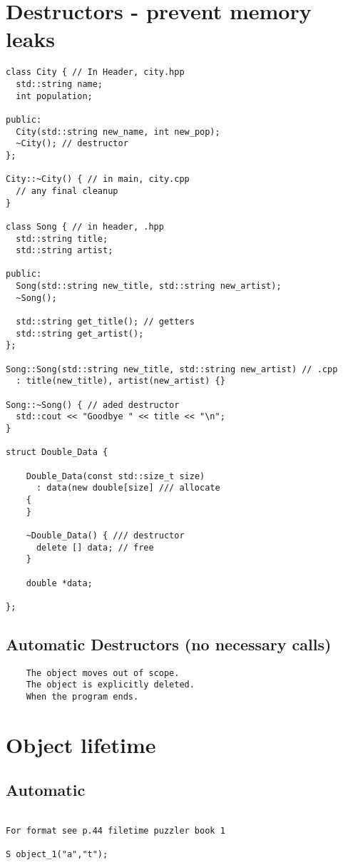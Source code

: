 \documentclass[openany]{report}
\begin{document}
\section{Destructors - prevent memory leaks}

\begin{verbatim}
class City { // In Header, city.hpp
  std::string name;
  int population;
 
public:
  City(std::string new_name, int new_pop);
  ~City(); // destructor
};
 
City::~City() { // in main, city.cpp
  // any final cleanup
}

class Song { // in header, .hpp
  std::string title;
  std::string artist;

public:
  Song(std::string new_title, std::string new_artist);
  ~Song();
  
  std::string get_title(); // getters
  std::string get_artist();
};

Song::Song(std::string new_title, std::string new_artist) // .cpp
  : title(new_title), artist(new_artist) {}

Song::~Song() { // aded destructor
  std::cout << "Goodbye " << title << "\n";
}

struct Double_Data {

    Double_Data(const std::size_t size)
      : data(new double[size] /// allocate
    {
    }

    ~Double_Data() { /// destructor
      delete [] data; // free
    }

    double *data;

};
\end{verbatim}

\subsection{Automatic Destructors (no necessary calls)}

\begin{verbatim}
    The object moves out of scope.
    The object is explicitly deleted.
    When the program ends.
\end{verbatim}

\section{Object lifetime}

\subsection{Automatic}
\begin{verbatim}

For format see p.44 filetime puzzler book 1

S object_1("a","t");
\end{verbatim}
\end{document}
